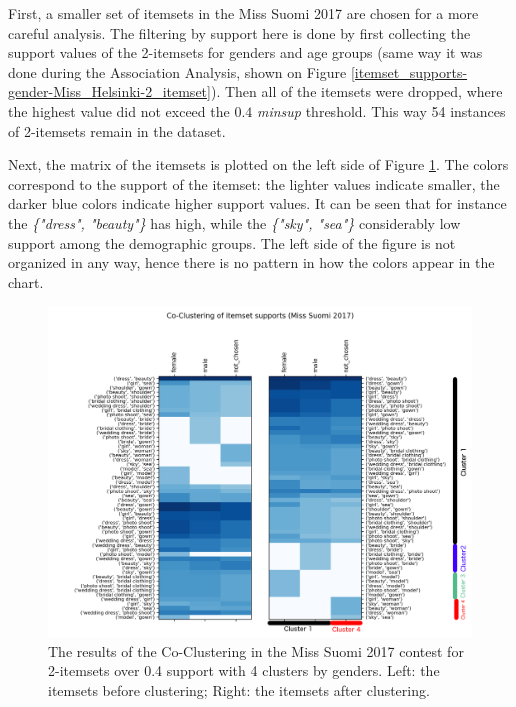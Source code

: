 First, a smaller set of itemsets in the Miss Suomi 2017 are chosen for a more careful analysis. The filtering by support here is done by first collecting the support values of the 2-itemsets for genders and age groups (same way it was done during the Association Analysis, shown on Figure \ref{itemset_supports-gender-Miss_Helsinki-2_itemset}). Then all of the itemsets were dropped, where the highest value did not exceed the $0.4$ \emph{minsup} threshold. This way 54 instances of 2-itemsets remain in the dataset.

Next, the matrix of the itemsets is plotted on the left side of Figure \ref{coclustering_miss-suomi-genders-2-itemsets-04_support}. The colors correspond to the support of the itemset: the lighter values indicate smaller, the darker blue colors indicate higher support values. It can be seen that for instance the \emph{\{"dress", "beauty"\}} has high, while the \emph{\{"sky", "sea"\}} considerably low support among the demographic groups. The left side of the figure is not organized in any way, hence there is no pattern in how the colors appear in the chart. 

\begin{figure}[h] 
    \begin{center}
        \includegraphics[width=1.0\textwidth]{Images/coclustering_miss-suomi-genders-2-itemsets-04_support.png}
        \caption{The results of the Co-Clustering in the Miss Suomi 2017 contest for 2-itemsets over 0.4 support with 4 clusters by genders. Left: the itemsets before clustering; Right: the itemsets after clustering.}
        \label{coclustering_miss-suomi-genders-2-itemsets-04_support}
    \end{center}
\end{figure}


